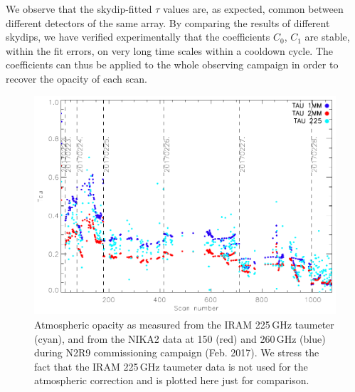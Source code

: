 
We observe that the skydip-fitted $\tau$ values are, as expected, common
between different detectors of the same array. By comparing the results of different skydips, we
have verified experimentally that the coefficients $C_0$, $C_1$ are stable,
within the fit errors, on very long time scales within a cooldown cycle. The
coefficients can thus be applied to the whole observing campaign in order to
recover the opacity of each scan.




\begin{figure}[ht]
\begin{center}
\includegraphics[scale=0.8]{../../../Paper_NIKA2_Technical/opacity_evol_run22.pdf}
\caption[Zenith opacity monitoring during N2R9]{Atmospheric opacity as measured from the IRAM 225\,GHz taumeter
(cyan), and from the NIKA2 data at 150 (red) and 260\,GHz (blue) during N2R9
commissioning campaign (Feb. 2017). We stress the fact that the IRAM 225\,GHz
taumeter data is not used for the atmospheric correction and is plotted here
just for comparison.
  \label{fig:taumeas_paper}}
\end{center}
\end{figure}


